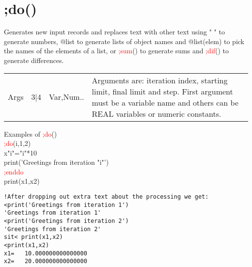 \section{;do()}
\label{inpudo}
Generates new input records and replaces text with other text
using " "  to generate numbers, @list to generate lists of object names
 and @\textcolor{VioletRed}{list}(elem) to pick the names of the elements of a list, or
\textcolor{Red}{;sum}() to generate sums and \textcolor{Red}{;dif}() to generate differences.
\begin{table}[H]
\begin{tabular}{ m{}  m{}m{}p{}}
Args&3|4&Var,Num..&Arguments are: iteration index, starting limit,
 final limit and step. First argument must be a variable name and others
can be REAL variables or numeric constants.
\\ \cline{1-4}
\end{tabular}
\end{table}
\begin{example}[inpudoex]Examples of \textcolor{Red}{;do}()\\
\label{inpudoex}
\textcolor{Red}{;do}(i,1,2)\\
x"i"="i"*10\\
\textcolor{VioletRed}{print}('Greetings from iteration "i"')\\
\textcolor{Red}{;enddo}\\
\textcolor{VioletRed}{print}(x1,x2)
\color{Green}
\begin{verbatim}
!After dropping out extra text about the processing we get:
<print('Greetings from iteration 1')
'Greetings from iteration 1'
<print('Greetings from iteration 2')
'Greetings from iteration 2'
sit< print(x1,x2)
<print(x1,x2)
x1=   10.000000000000000
x2=   20.000000000000000
\end{verbatim}
\color{Black}
\end{example}
